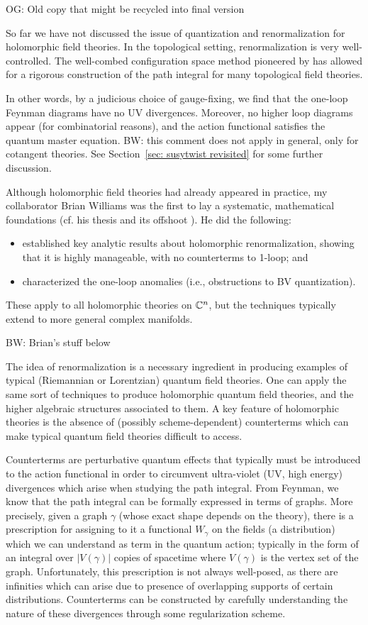 \documentclass[11pt]{amsart}
\def\brian#1{{\textcolor{blue!75!red}{BW: {#1}}}}
\def\owen#1{{\textcolor{violet!50!black}{OG: {#1}}}}
\begin{document}
\owen{Old copy that might be recycled into final version}

So far we have not discussed the issue of quantization and renormalization for holomorphic field theories.
In the topological setting, renormalization is very well-controlled.
The well-combed configuration space method pioneered by \cite{} has allowed for a rigorous construction of the path integral for many topological field theories. 


In other words, by a judicious choice of gauge-fixing, 
we find that the one-loop Feynman diagrams have no UV divergences.
Moreover, no higher loop diagrams appear (for combinatorial reasons),
and the action functional satisfies the quantum master equation.
\brian{this comment does not apply in general, only for cotangent theories.}
See Section~\ref{sec: susytwist revisited} for some further discussion.

Although holomorphic field theories had already appeared in practice,
my collaborator Brian Williams was the first to lay a systematic, mathematical foundations (cf. his thesis \cite{BWthesis} and its offshoot \cite{BWhol}).
He did the following:
\begin{itemize}
\item established key analytic results about holomorphic renormalization, 
showing that it is highly manageable, with no counterterms to 1-loop; and
\item characterized the one-loop anomalies  (i.e., obstructions to BV quantization).
\end{itemize}
These apply to all holomorphic theories on $\mathbb C^n$,
but the techniques typically extend to more general complex manifolds.

\brian{Brian's stuff below}

The idea of renormalization is a necessary ingredient in producing examples of typical (Riemannian or Lorentzian) quantum field theories.
One can apply the same sort of techniques to produce holomorphic quantum field theories, and the higher algebraic structures associated to them.
A key feature of holomorphic theories is the absence of (possibly scheme-dependent) counterterms which can make typical quantum field theories difficult to access.

Counterterms are perturbative quantum effects that typically must be introduced to the action functional in order to circumvent ultra-violet (UV, high energy) divergences which arise when studying the path integral.
From Feynman, we know that the path integral can be formally expressed in terms of graphs. 
More precisely, given a graph $\gamma$ (whose exact shape depends on the theory), there is a prescription for assigning to it a functional $W_\gamma$ on the fields (a distribution) which we can understand as term in the quantum action; typically in the form of an integral over $|V(\gamma)|$ copies of spacetime where $V(\gamma)$ is the vertex set of the graph.
Unfortunately, this prescription is not always well-posed, as there are infinities which can arise due to presence of overlapping supports of certain distributions.
Counterterms can be constructed by carefully understanding the nature of these divergences through some regularization scheme.
\end{document}
